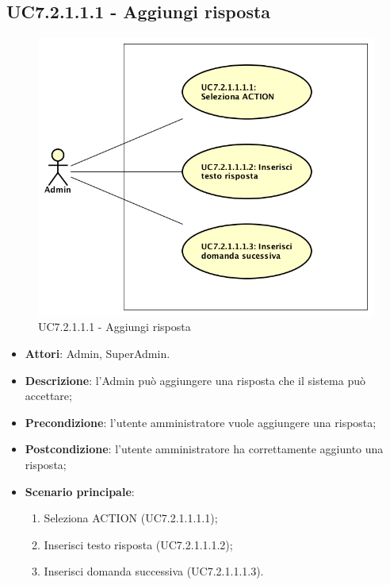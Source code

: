 \documentclass[../AnalisiDeiRequisiti_v3.0.0.tex]{subfiles}
\begin{document}
\begin{itemize}
\subsection{UC7.2.1.1.1 - Aggiungi risposta} 
\label{sssec:UC7.2.1.1.1} 
\begin{figure}[!h]
	\centering
	\includegraphics[scale=0.7]{UseCases/UC7_GestionePannelloAdmin/UC7_2_GestioneDomande/UC7_2_1_AggiungiDomanda/UC7_2_1_1_GestioneRisposte/UC7_2_1_1_1_AggiungiRisposta/UC7_2_1_1_1_AggiungiRisposta.png}
	\caption{UC7.2.1.1.1 - Aggiungi risposta}
\end{figure}
\begin{itemize} 
\item \textbf{Attori}: Admin, SuperAdmin.
\item \textbf{Descrizione}: l'Admin può aggiungere una risposta che il sistema può accettare;
\item \textbf{Precondizione}: l'utente amministratore vuole aggiungere una risposta;
\item \textbf{Postcondizione}: l'utente amministratore ha correttamente aggiunto una risposta;
\item \textbf{Scenario principale}: \begin{enumerate}\item Seleziona ACTION (UC7.2.1.1.1.1);\item Inserisci testo risposta (UC7.2.1.1.1.2);\item Inserisci domanda successiva (UC7.2.1.1.1.3).
\end{enumerate}
\end{itemize}  

\end{itemize}
\end{document}
